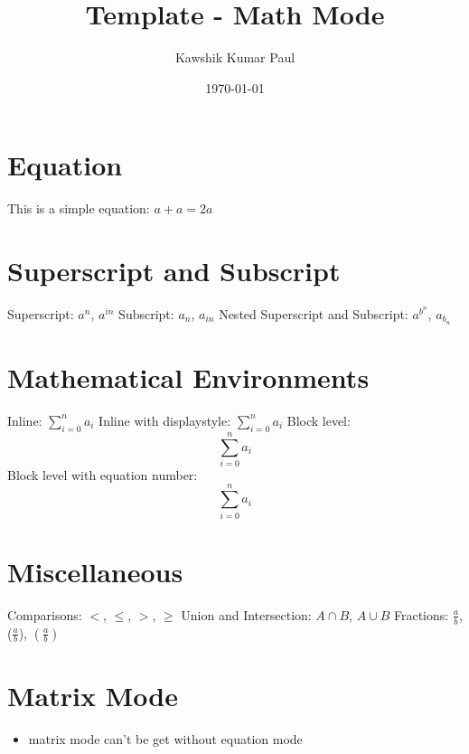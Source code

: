\documentclass[16pt, a4paper]{article} %
\title{Template - Math Mode}
\author{Kawshik Kumar Paul}
\date{\today}
\begin{document}
\maketitle
\tableofcontents %
\pagebreak %

\section{Equation}
This is a simple equation: $a + a = 2a$

\section{Superscript and Subscript}
Superscript: $a^n$, $a^{in}$
\newline
Subscript: $a_n$, $a_{in}$
\newline
Nested Superscript and Subscript: $a^{b^n}$, $a_{b_n}$

\section{Mathematical Environments}
Inline: $\sum_{i=0}^n a_i$
\newline
Inline with displaystyle: $\displaystyle\sum_{i=0}^n a_i$
\newline
Block level: $$\sum_{i=0}^n a_i$$
\newline
Block level with equation number:
\begin{equation}
\sum_{i=0}^n a_i
\end{equation}

\section{Miscellaneous}
Comparisons:
$ <$, $ \leq $, $ > $, $\geq $
\newline
Union and Intersection:
$A \cap B$, $A \cup B$
\newline
Fractions: $\frac{a}{b}$, ($\frac{a}{b}$), $\left(\frac{a}{b}\right)$

\pagebreak
\section{Matrix Mode}
    \begin{itemize}
    \item matrix mode can't be get without equation mode 
    \end{itemize}
\end{document}
